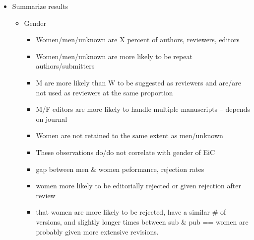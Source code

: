 \documentclass[11pt,]{article}
\providecommand{\tightlist}{%
  \setlength{\itemsep}{0pt}\setlength{\parskip}{0pt}}
\begin{document}
\begin{itemize}
\tightlist
\item
  Summarize results

  \begin{itemize}
  \tightlist
  \item
    Gender

    \begin{itemize}
    \tightlist
    \item
      Women/men/unknown are X percent of authors, reviewers, editors
    \item
      Women/men/unknown are more likely to be repeat authors/submitters
    \item
      M are more likely than W to be suggested as reviewers and are/are
      not used as reviewers at the same proportion
    \item
      M/F editors are more likely to handle multiple manuscripts --
      depends on journal
    \item
      Women are not retained to the same extent as men/unknown
    \item
      These observations do/do not correlate with gender of EiC
    \item
      gap between men \& women peformance, rejection rates
    \item
      women more likely to be editorially rejected or given rejection
      after review
    \item
      that women are more likely to be rejected, have a similar \# of
      versions, and slightly longer times between sub \& pub == women
      are probably given more extensive revisions.
    \end{itemize}
  \end{itemize}
\end{itemize}
\end{document}
